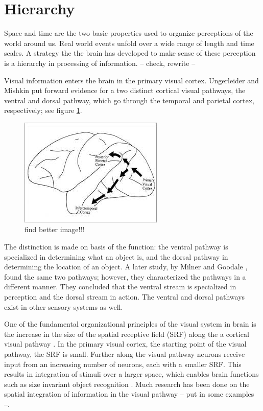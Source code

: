 \section{Hierarchy}
Space and time are the two basic properties used to organize perceptions of the world around us. Real world events unfold over a wide range of length and time scales. A strategy the the brain has developed to make sense of these perception is a hierarchy in processing of information. -- check, rewrite --

Visual information enters the brain in the primary visual cortex.
Ungerleider and Mishkin \cite{mishkin1983object} put forward evidence for a two distinct cortical visual pathways, the ventral and dorsal pathway, which go through the temporal and parietal cortex, respectively; see figure \ref{fig:visualpathways}. 
\begin{figure}[!ht]
\label{fig:visualpathways}
\includegraphics[scale=1]{hierarchy_figures/visualpathways}
\caption{find better image!!!}
\end{figure}
The distinction is made on basis of the function: the ventral pathway is specialized in determining what an object is, and the dorsal pathway in determining the location of an object.
A later study, by  Milner and Goodale \cite{milner2008two, goodale1992separate}, found the same two pathways; however, they characterized the pathways in a different manner. They concluded that the ventral stream is specialized in perception and the dorsal stream in action.
The ventral and dorsal pathways exist in other sensory systems as well.

One of the fundamental organizational principles of the visual system in brain is the increase in the size of the spatial receptive field (SRF) along the a cortical visual pathway \cite{hubel1988eye,hubel1962receptive,lerner2001hierarchical}.
In the primary visual cortex,  the starting point of the visual pathway, the SRF is small.
Further along the visual pathway neurons receive input from an increasing number of neurons, each with a smaller SRF. This results in integration of stimuli over a larger space, which enables brain functions such as size invariant object recognition \cite{kobatake1994neuronal}.
Much research has been done on the spatial integration of information in the visual pathway \cite{deyoe1996mapping} -- put in some examples --. 


